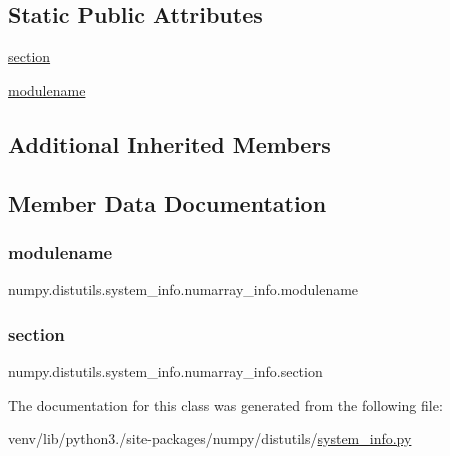 \subsection*{Static Public Attributes}
\begin{DoxyCompactItemize}
\item 
\hyperlink{classnumpy_1_1distutils_1_1system__info_1_1numarray__info_a5d5da363bcc35c22263bebb6704f73bd}{section}
\item 
\hyperlink{classnumpy_1_1distutils_1_1system__info_1_1numarray__info_aa80f445217ca3de550b0919ed2904035}{modulename}
\end{DoxyCompactItemize}
\subsection*{Additional Inherited Members}


\subsection{Member Data Documentation}
\mbox{\label{classnumpy_1_1distutils_1_1system__info_1_1numarray__info_aa80f445217ca3de550b0919ed2904035}} 
\subsubsection{\texorpdfstring{modulename}{modulename}}
{\footnotesize\ttfamily numpy.\+distutils.\+system\+\_\+info.\+numarray\+\_\+info.\+modulename\hspace{0.3cm}{\ttfamily [static]}}

\mbox{\label{classnumpy_1_1distutils_1_1system__info_1_1numarray__info_a5d5da363bcc35c22263bebb6704f73bd}} 
\subsubsection{\texorpdfstring{section}{section}}
{\footnotesize\ttfamily numpy.\+distutils.\+system\+\_\+info.\+numarray\+\_\+info.\+section\hspace{0.3cm}{\ttfamily [static]}}



The documentation for this class was generated from the following file\+:\begin{DoxyCompactItemize}
\item 
venv/lib/python3./site-\/packages/numpy/distutils/\hyperlink{system__info_8py}{system\+\_\+info.\+py}\end{DoxyCompactItemize}
